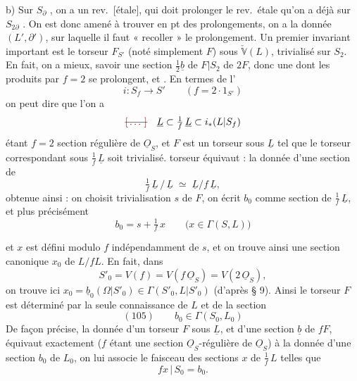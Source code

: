 \documentclass[11pt,a4paper]{article}
\begin{document}
b) Sur $S_{\partial}$ \struck{\ill{}} , on a un rev.\ [étale], qui
doit prolonger le rev.\ étale qu'on a déjà sur $S_{2\partial}$
\struck{\ill{}}.
On est donc amené 
à trouver en pt des prolongements, on a \ill{} la donnée $(L', \partial')$, sur laquelle
\struck{\ill{}}
il faut « recoller » le prolongement. Un premier invariant
important est le torseur
\struck{\ill{}} $F_{S'}$ (noté simplement $F$) sous $\check{\mathbb{V}}(L)$,
trivialisé sur $S_2$. En fait, on a mieux, savoir une
section  $\tfrac{1}{2}\underline{b}$ de $F|S_2$
 de $2F$, donc une \struck{\ill{}}
dont les produits par $f = 2$ se
prolongent, et    
. En termes de l'
\[
i : S_f \longrightarrow S' \qquad (f = 2 \cdot 1_{S'})
\]
on peut dire que l'on a
\[
\text{\struck{\ill{}}}\quad \underline{L} \subset \tfrac{1}{f}\, \underline{L} \subset i_*(L|S_f)
\]
étant  $f = 2$ section régulière de
$\underline{O}_S$, et $F$ est un torseur sous $\underline{L}$ tel que le torseur
correspondant sous $\tfrac{1}{f}\,\underline{L}$ soit trivialisé.
  torseur
 équivaut : la donnée d'une section de
\[
\tfrac{1}{f}\,\underline{L} \,/\, \underline{L} \;\simeq\; \underline{L} / f\,\underline{L} ,
\]
\struck{\ill{}} obtenue ainsi : on choisit   trivialisation
\struck{\ill{}} $s$ de $F$, on écrit $b_0$ comme section de
 $\tfrac{1}{f}\,\underline{L}$, et plus précisément
\[
b_0 = s + \tfrac{1}{f}\, x \qquad \bigl(x \in \Gamma(S, L)\bigr)
\]

et $x$ est défini modulo $f$ indépendamment de $s$, et on trouve ainsi une
section canonique $x_0$ de $L / f L$. En fait,  dans
\[
S'_0 = V(f) = V(f\,\underline{O}_S) = V(2\,\underline{O}_S),
\]
on trouve ici $x_0 = \underline{b}_0(\Omega|S'_0) \in \Gamma(S'_0, L|S'_0)$
(d'après § 9). Ainsi le torseur $F$ est déterminé
par la seule connaissance de $L$ et de la section
\[
(105)\qquad b_0 \in \Gamma(S_0, L_0)
\]
De façon précise, la donnée d'un torseur $F$ sous $\underline{L}$, et d'une section
$\underline{b}$ de $fF$, équivaut exactement ($f$ étant une section
$\underline{O}_S$-régulière de $\underline{O}_S$) à la donnée d'une section $b_0$ de $L_0$,
on lui associe le  faisceau  
des sections $x$ de $\tfrac{1}{f}\,L$ telles que
\[
f x \,|\, S_0 = b_0 .
\]
\end{document}
